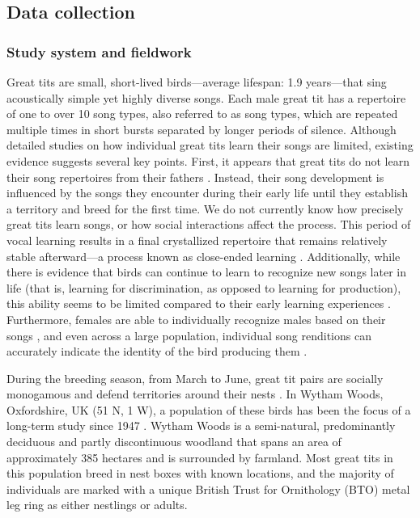 \documentclass[9pt, onecolumn, twoside, lineno]{gsajnl}
\begin{document}
\subsection{Data collection}

\subsubsection{Study system and fieldwork}

Great tits are small, short-lived birds---average lifespan: 1.9 years---that sing acoustically simple yet highly diverse songs. Each male great tit has a repertoire of one to over 10 song types, also referred to as song types, which are repeated multiple times in short bursts separated by longer periods of silence. Although detailed studies on how individual great tits learn their songs are limited, existing evidence suggests several key points. First, it appears that great tits do not learn their song repertoires from their fathers \autocite{mcgregor1982b}. Instead, their song development is influenced by the songs they encounter during their early life until they establish a territory and breed for the first time. We do not currently know how precisely great tits learn songs, or how social interactions affect the process. This period of vocal learning results in a final crystallized repertoire that remains relatively stable afterward---a process known as close-ended learning \autocite{rivera-gutierrez2011}. Additionally, while there is evidence that birds can continue to learn to recognize new songs later in life (that is, learning for  discrimination, as opposed to learning for production), this ability seems to be limited compared to their early learning experiences \autocite{mcgregor1986}. Furthermore, females are able to individually recognize males based on their songs \autocite{lind1996}, and even across a large population, individual song renditions can accurately indicate the identity of the bird producing them \autocite{merinorecalde2023a}.

During the breeding season, from March to June, great tit pairs are socially monogamous and defend territories around their nests \autocite{hinde1952}. In Wytham Woods, Oxfordshire, UK (51 N, 1 W), a population of these birds has been the focus of a long-term study since 1947 \autocite{lack1964}. Wytham Woods is a semi-natural, predominantly deciduous and partly discontinuous woodland that spans an area of approximately 385 hectares and is surrounded by farmland. Most great tits in this population breed in nest boxes with known locations, and the majority of individuals are marked with a unique British Trust for Ornithology (BTO) metal leg ring as either nestlings or adults.
\end{document}
